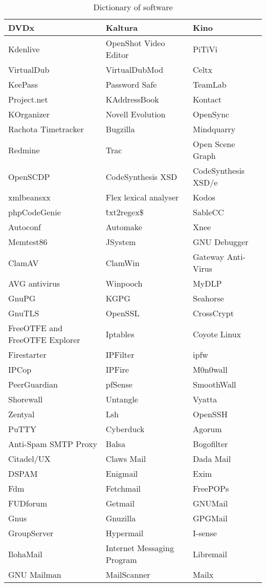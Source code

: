 \begin{table}
\begin{center}
\begin{tabular}{|l|l|l|}\hline
DVDx&Kaltura&Kino\\\hline
Kdenlive&OpenShot Video Editor&PiTiVi\\\hline
VirtualDub&VirtualDubMod&Celtx\\\hline
KeePass&Password Safe&TeamLab\\\hline
Project.net&KAddressBook&Kontact\\\hline
KOrganizer&Novell Evolution&OpenSync\\\hline
Rachota Timetracker&Bugzilla&Mindquarry\\\hline
Redmine&Trac&Open Scene Graph\\\hline
OpenSCDP&CodeSynthesis XSD&CodeSynthesis XSD/e\\\hline
xmlbeansxx&Flex lexical analyser&Kodos\\\hline
phpCodeGenie&\^txt2regex\$&SableCC\\\hline
Autoconf&Automake&Xnee\\\hline
Memtest86&JSystem&GNU Debugger\\\hline
ClamAV&ClamWin&Gateway Anti-Virus\\\hline
AVG antivirus&Winpooch&MyDLP\\\hline
GnuPG&KGPG&Seahorse\\\hline
GnuTLS&OpenSSL&CrossCrypt\\\hline
FreeOTFE and FreeOTFE Explorer&Iptables&Coyote Linux\\\hline
Firestarter&IPFilter&ipfw\\\hline
IPCop&IPFire&M0n0wall\\\hline
PeerGuardian&pfSense&SmoothWall\\\hline
Shorewall&Untangle&Vyatta\\\hline
Zentyal&Lsh&OpenSSH\\\hline
PuTTY&Cyberduck&Agorum\\\hline
Anti-Spam SMTP Proxy&Balsa&Bogofilter\\\hline
Citadel/UX&Claws Mail&Dada Mail\\\hline
DSPAM&Enigmail&Exim\\\hline
Fdm&Fetchmail&FreePOPs\\\hline
FUDforum&Getmail&GNUMail\\\hline
Gnus&Gnuzilla&GPGMail\\\hline
GroupServer&Hypermail&I-sense\\\hline
IlohaMail&Internet Messaging Program&Libremail\\\hline
GNU Mailman&MailScanner&Mailx\\\hline
\end{tabular}
\end{center}
\caption{Dictionary of software}
\end{table}
